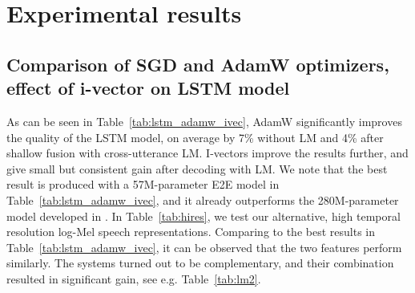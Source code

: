 \documentclass[a4paper]{article}
\begin{document}
\vspace{0mm}
\section{Experimental results}
\vspace{0mm}
\label{sec:expr}
\subsection{Comparison of SGD and AdamW optimizers, effect of i-vector on LSTM model}
\vspace{-1mm}
As can be seen in Table~\ref{tab:lstm_adamw_ivec}, AdamW significantly improves the quality of the LSTM model, on average by 7\% without LM and 4\% after shallow fusion with cross-utterance LM.
I-vectors improve the results further, and give small but consistent gain after decoding with LM.
We note that the best result is produced with a 57M-parameter E2E model in Table~\ref{tab:lstm_adamw_ivec}, and it already outperforms the 280M-parameter model developed in \cite{Tuske2020}.
In Table~\ref{tab:hires}, we test our alternative, high temporal resolution log-Mel speech representations.
Comparing to the best results in Table~\ref{tab:lstm_adamw_ivec}, it can be observed that the two features perform similarly.
The systems turned out to be complementary, and their combination resulted in significant gain, see e.g. Table~\ref{tab:lm2}.
\end{document}
